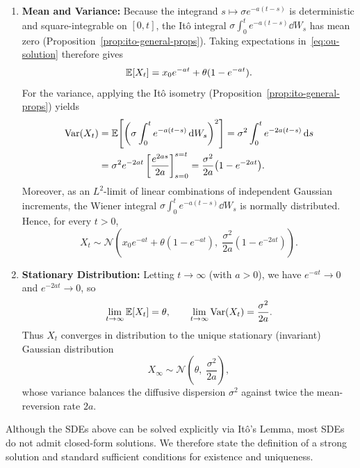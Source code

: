 \begin{example}
\begin{enumerate}
    \item \textbf{Mean and Variance:} Because the integrand $s \mapsto \sigma e^{-a(t-s)}$ is deterministic and square-integrable on $[0, t]$, the It\^o integral $\sigma \int_0^t e^{-a(t-s)}\dd W_s$ has mean zero (Proposition~\ref{prop:ito-general-props}). Taking expectations in~\eqref{eq:ou-solution} therefore gives
    \[
    \mathbb{E}[X_t] = x_0 e^{-at} + \theta(1 - e^{-at}).
    \]
    For the variance, applying the It\^o isometry (Proposition~\ref{prop:ito-general-props}) yields
    \begin{align*}
    \operatorname{Var}(X_t)
    &= \mathbb{E}\!\left[\left(\sigma \int_0^t e^{-a(t-s)}\,\mathrm{d} W_s\right)^2\right]
    = \sigma^2 \int_0^t e^{-2a(t-s)}\,\mathrm{d} s \\
    &= \sigma^2 e^{-2at}\left[\frac{e^{2as}}{2a}\right]_{s=0}^{s=t}
    = \frac{\sigma^2}{2a}\big(1 - e^{-2at}\big).
    \end{align*}
    Moreover, as an $L^2$-limit of linear combinations of independent Gaussian increments, the Wiener integral $\sigma \int_0^t e^{-a(t-s)}\dd W_s$ is normally distributed. Hence, for every $t > 0$,
    \[
    X_t \sim \mathcal{N}\!\left(x_0 e^{-at} + \theta(1 - e^{-at}),\; \frac{\sigma^2}{2a}(1 - e^{-2at})\right).
    \]

    \item \textbf{Stationary Distribution:} Letting $t \to \infty$ (with $a > 0$), we have $e^{-at} \to 0$ and $e^{-2at} \to 0$, so
    \[
    \lim_{t \to \infty} \mathbb{E}[X_t] = \theta, \qquad \lim_{t \to \infty} \operatorname{Var}(X_t) = \frac{\sigma^2}{2a}.
    \]
    Thus $X_t$ converges in distribution to the unique stationary (invariant) Gaussian distribution
    \[
    X_\infty \sim \mathcal{N}\!\left(\theta,\; \frac{\sigma^2}{2a}\right),
    \]
    whose variance balances the diffusive dispersion $\sigma^2$ against twice the mean-reversion rate $2a$.
\end{enumerate}
\end{example}

Although the SDEs above can be solved explicitly via It\^o's Lemma, most SDEs do not admit closed-form solutions. We therefore state the definition of a strong solution and standard sufficient conditions for existence and uniqueness.

